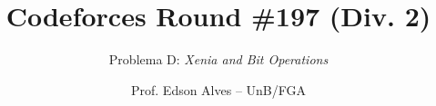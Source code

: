 \title{Codeforces Round \#197 (Div. 2)}
\subtitle{Problema D: \textit{Xenia and Bit Operations}}
\author{Prof. Edson Alves -- UnB/FGA}
\date{}
